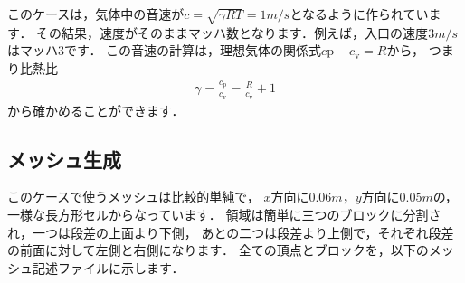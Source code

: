 このケースは，気体中の音速が$c = \sqrt{\gamma RT} = 1 \unit{m/s}$となるように作られています．
その結果，速度がそのままマッハ数となります．例えば，入口の速度$3 \unit{m/s}$はマッハ$3$です．
この音速の計算は，理想気体の関係式$c{\mathrm{p}} - c_{\mathrm{v}} = R$から，
つまり比熱比
\begin{align}
 \label{eq:3.12}
 \gamma = \frac{c_{\mathrm{p}}}{c_{\mathrm{v}}} = \frac{R}{c_{\mathrm{v}}} + 1
\end{align}
から確かめることができます．


\subsection{メッシュ生成}
\label{ssec:3.3.2}
このケースで使うメッシュは比較的単純で，
$x$方向に$0.06 \unit{m}$，$y$方向に$0.05 \unit{m}$の，
一様な長方形セルからなっています．
領域は簡単に三つのブロックに分割され，一つは段差の上面より下側，
あとの二つは段差より上側で，それぞれ段差の前面に対して左側と右側になります．
全ての頂点とブロックを，以下のメッシュ記述ファイルに示します．
